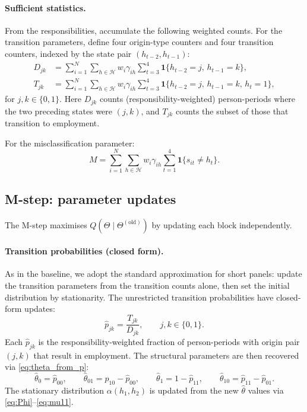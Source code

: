 \documentclass[12pt]{article}
\begin{document}
\paragraph{Sufficient statistics.}
From the responsibilities, accumulate the following weighted counts.
For the transition parameters, define four origin-type counters and
four transition counters, indexed by the state pair
$(h_{t-2}, h_{t-1})$:
\begin{align}
D_{jk} &= \sum_{i=1}^{N} \sum_{h \in \mathcal{H}} w_i \gamma_{ih}
  \sum_{t=3}^{4} \mathbf{1}\{h_{t-2} = j,\, h_{t-1} = k\},
  \label{eq:ar2_suff_D} \\[4pt]
T_{jk} &= \sum_{i=1}^{N} \sum_{h \in \mathcal{H}} w_i \gamma_{ih}
  \sum_{t=3}^{4} \mathbf{1}\{h_{t-2} = j,\, h_{t-1} = k,\, h_t = 1\},
  \label{eq:ar2_suff_T}
\end{align}
for $j, k \in \{0, 1\}$. Here $D_{jk}$ counts
(responsibility-weighted) person-periods where the two preceding states
were $(j, k)$, and $T_{jk}$ counts the subset of those that transition
to employment.

For the misclassification parameter:
\begin{equation}
M = \sum_{i=1}^{N} \sum_{h \in \mathcal{H}} w_i \gamma_{ih}
  \sum_{t=1}^{4} \mathbf{1}\{s_{it} \neq h_t\}.
  \label{eq:ar2_suff_M}
\end{equation}

\subsection{M-step: parameter updates}
\label{sec:ar2_mstep}

The M-step maximises $Q(\Theta \mid \Theta^{(\mathrm{old})})$ by
updating each block independently.

\paragraph{Transition probabilities (closed form).}
As in the baseline, we adopt the standard approximation for short
panels: update the transition parameters from the transition counts
alone, then set the initial distribution by stationarity. The
unrestricted transition probabilities have closed-form updates:
\begin{equation}
\hat{p}_{jk} = \frac{T_{jk}}{D_{jk}}, \qquad j, k \in \{0, 1\}.
\label{eq:ar2_mstep_p}
\end{equation}
Each $\hat{p}_{jk}$ is the responsibility-weighted fraction of
person-periods with origin pair $(j, k)$ that result in employment.
The structural parameters are then recovered via
\eqref{eq:theta_from_p}:
\begin{equation}
\hat{\theta}_0 = \hat{p}_{00}, \qquad
\hat{\theta}_{01} = \hat{p}_{10} - \hat{p}_{00}, \qquad
\hat{\theta}_1 = 1 - \hat{p}_{11}, \qquad
\hat{\theta}_{10} = \hat{p}_{11} - \hat{p}_{01}.
\label{eq:ar2_mstep_theta}
\end{equation}
The stationary distribution $\alpha(h_1, h_2)$ is updated from the new
$\hat{\theta}$ values via
\eqref{eq:Phi}--\eqref{eq:mu11}.
\end{document}
